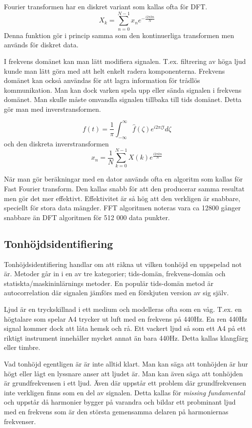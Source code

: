 Fourier transformen har en diskret variant som kallas ofta för DFT. 
$$X_k = \sum_{n=0}^{N-1} x_ne^{-\frac{i2\pi kn}{N}}$$
Denna funktion gör i princip samma som den kontinuerliga transformen men används för diskret data.

I frekvens domänet kan man lätt modifiera signalen. T.ex. filtrering av höga ljud kunde man lätt göra med att helt enkelt radera komponenterna. Frekvens domänet kan också användas för att lagra information för trådlös kommunikation. Man kan dock varken spela upp eller sända signalen i frekvens domänet. Man skulle måste omvandla signalen tillbaka till tids domänet. Detta gör man med inverstransformen. 

$$ f(t) = \frac{1}{\pi}\int_{-\infty}^{\infty} \hat{f}(\zeta)e^{i2\pi\zeta t} d\zeta$$
och den diskreta inverstransformen
$$ x_n = \frac{1}{N}\sum_{k=0}^{N-1} X(k)e^{\frac{i2\pi kn}{N}}$$

När man gör beräkningar med en dator används ofta en algoritm som kallas för Fast Fourier transform. Den kallas snabb för att den producerar samma resultat men  gör det mer effektivt. Effektivitet är så hög att den verkligen är snabbare, speciellt för stora data mängder. FFT algoritmen noteras vara ca 12800 gånger snabbare än DFT algoritmen för 512 000 data punkter.  
\subsection*{Tonhöjdsidentifiering}
Tonhöjdsidentifiering handlar om att räkna ut vilken tonhöjd en uppspelad not är. Metoder går in i en av tre kategorier; tids-domän, frekvens-domän och statiskta/maskininlärnings metoder. En populär tids-domän metod är autocorrelation där signalen jämförs med en förskjuten version av sig själv. 

Ljud är en tryckskillnad i ett medium och modelleras ofta som en våg. T.ex. en högtalare som spelar A4 trycker ut luft med en frekvens på 440Hz. En ren 440Hz signal kommer dock att låta hemsk och rå. Ett vackert ljud så som ett A4 på ett riktigt instrument innehåller mycket annat än bara 440Hz. Detta kallas klangfärg eller timbre.

Vad tonhöjd egentligen är är inte alltid klart. Man kan säga att tonhöjden är hur högt eller lågt en lyssnare anser att ljudet är. Man kan även säga att tonhöjden är grundfrekvensen i ett ljud. Även där uppstår ett problem där grundfrekvensen inte verkligen finns som en del av signalen. Detta kallas för \textit{missing fundamental} och uppstår då harmonier bygger på varandra och bildar ett probminant ljud med en frekvens som är den största gemensamma delaren på harmoniernas frekvenser.

